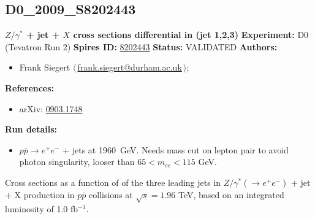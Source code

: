 \subsection[D0\_2009\_S8202443]{D0\_2009\_S8202443\,\cite{Abazov:2009av}}
\textbf{$Z/\gamma^*$ + jet + $X$ cross sections differential in \pT(jet 1,2,3)}\newline
\textbf{Experiment:} D0 (Tevatron Run 2) \newline
\textbf{Spires ID:} \href{http://www.slac.stanford.edu/spires/find/hep/www?rawcmd=key+8202443}{8202443}\newline
\textbf{Status:} VALIDATED\newline
\textbf{Authors:}
\begin{itemize}
  \item Frank Siegert $\langle\,$\href{mailto:frank.siegert@durham.ac.uk}{frank.siegert@durham.ac.uk}$\,\rangle$;
\end{itemize}
\textbf{References:}
\begin{itemize}
  \item arXiv: \href{http://arxiv.org/abs/0903.1748}{0903.1748}
\end{itemize}
\textbf{Run details:}
\begin{itemize}

  \item $p \bar{p} \to e^+ e^-$ + jets at 1960~GeV. Needs mass cut on lepton pair to avoid photon singularity, looser than $65 < m_{ee} < 115$ GeV.\end{itemize}

\noindent Cross sections as a function of \pT of the three leading jets in $Z/\gamma^{*} (\to e^{+} e^{-})$ + jet + X production in $p \bar{p}$ collisions at $\sqrt{s} = 1.96$ TeV, based on an integrated luminosity of 1.0 fb$^{-1}$.

\clearpage


\clearpage

